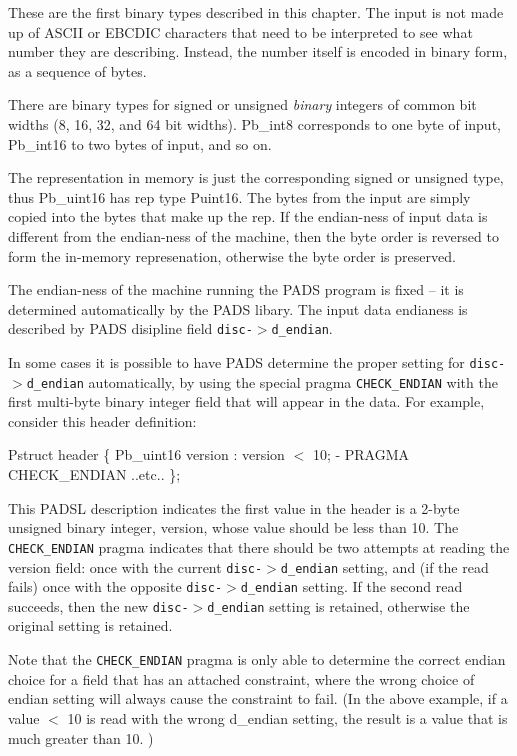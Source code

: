 These are the first binary types described in this chapter. The input
is not made up of ASCII or EBCDIC characters that need to be interpreted
to see what number they are describing.  Instead, the number itself is
encoded in binary form, as a sequence of bytes.  

There are binary types for signed or unsigned {\em binary\/} integers
of common bit widths (8, 16, 32, and 64 bit widths).  Pb\_int8 corresponds
to one byte of input, Pb\_int16 to two bytes of input, and so on.

The representation in memory is just the corresponding signed or
unsigned type, thus Pb\_uint16 has rep type Puint16.  The bytes from
the input are simply copied into the bytes that make up the rep.  If
the endian-ness of input data is different from the endian-ness of the
machine, then the byte order is reversed to form the in-memory
represenation, otherwise the byte order is preserved.

The endian-ness of the machine running the PADS program is fixed -- it
is determined automatically by the PADS libary.  
The input data endianess is described by PADS disipline 
field {\tt disc-$>$d\_endian}. 

In some cases it is possible to have PADS determine the
proper setting for {\tt disc-$>$d\_endian} automatically, by
using the special pragma {\tt CHECK\_ENDIAN}
with the first multi-byte binary integer field that will appear
in the data.  For example, consider this header definition:
\begin{tinycodeaux}{\leftmargin=0in}
Pstruct header \{
   Pb\_uint16 version : version $<$ 10; \/\/- PRAGMA CHECK\_ENDIAN
   ..etc..
\};
\end{tinycodeaux}
This PADSL description indicates the first value in the header
is a 2-byte unsigned binary integer, version,
whose value should be less than 10.   The  {\tt CHECK\_ENDIAN} pragma indicates that there
should be two attempts at reading the version field: once with the
 current {\tt disc-$>$d\_endian} setting, and (if the read fails) once with the
opposite {\tt disc-$>$d\_endian} setting.  If the second read succeeds, then
the new {\tt disc-$>$d\_endian} setting is retained, otherwise the original
setting is retained.

Note that the {\tt CHECK\_ENDIAN} pragma is only able to determine the correct endian
choice for a field that has an attached constraint, where the
wrong choice of endian setting will always cause the constraint to fail.
(In the above example, if a value $<$ 10 is read with the wrong d\_endian
setting, the result is a value that is much greater than 10. )

